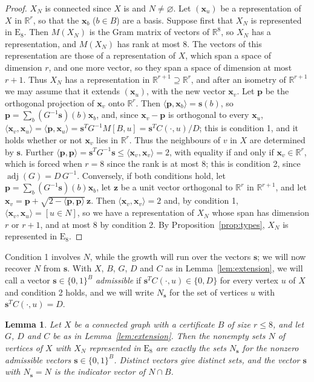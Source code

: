 \documentclass[11pt]{article}
\newcommand\re{{\mathbb R}}%
\newcommand\Zz{{\mathbf z}}
\newcommand\Zx{{\mathbf x}}
\newcommand\inv{^{-1}}
\newcommand\sps{\supseteq}
\newcommand\ip[2]{\langle#1,#2\rangle}
\newtheorem{lemma}[theorem]{Lemma}
\theoremstyle{definition}
\newcommand{\typ}[1]{\mathrm{#1}}
\newcommand\Zs{{\mathbf s}}
\newcommand\Zp{{\mathbf p}}
\begin{document}
\begin{proof}
$X_N$ is connected since $X$ is and $N\ne\varnothing$. Let $(\Zx_u)$ be a representation of $X$ in
$\re^r$, so that the $\Zx_b$ ($b\in B$) are a basis. Suppose first that $X_N$ is represented in
$\typ E_8$. Then $M(X_N)$ is the Gram matrix of vectors of $\re^8$, so $X_N$ has a
representation, and $M(X_N)$ has rank at most $8$. The vectors of this representation are those
of a representation of $X$, which span a space of dimension $r$, and one more vector, so they span
a space of dimension at most $r+1$. Thus $X_N$ has a representation in $\re^{r+1}\sps\re^r$, and
after an isometry of $\re^{r+1}$ we may assume that it extends $(\Zx_u)$, with the new vector
$\Zx_v$. Let $\Zp$ be the orthogonal projection of $\Zx_v$ onto $\re^r$. Then
$\ip{\Zp}{\Zx_b}=\Zs(b)$, so $\Zp=\sum_b(G\inv\Zs)(b)\Zx_b$, and, since $\Zx_v-\Zp$ is orthogonal
to every $\Zx_u$,
$\ip{\Zx_v}{\Zx_u}=\ip{\Zp}{\Zx_u}=\Zs^TG\inv M[B,u]=\Zs^TC(\cdot,u)/D$; this is condition 1,
and it holds whether or not $\Zx_v$ lies in $\re^r$. Thus the neighbours of $v$ in $X$ are
determined by $\Zs$. Further $\ip{\Zp}{\Zp}=\Zs^TG\inv\Zs\le\ip{\Zx_v}{\Zx_v}=2$, with equality
if and only if $\Zx_v\in\re^r$, which is forced when $r=8$ since the rank is at most $8$; this is
condition 2, since $\operatorname{adj}(G)=D\,G\inv$.
Conversely, if both conditions hold, let $\Zp=\sum_b(G\inv\Zs)(b)\Zx_b$, let $\Zz$ be a unit
vector orthogonal to $\re^r$ in $\re^{r+1}$, and let $\Zx_v=\Zp+\sqrt{2-\ip{\Zp}{\Zp}}\,\Zz$.
Then $\ip{\Zx_v}{\Zx_v}=2$ and, by condition 1, $\ip{\Zx_v}{\Zx_u}=[u\in N]$, so we have a
representation of $X_N$ whose span has dimension $r$ or $r+1$, and at most $8$ by condition 2. By
Proposition~\ref{prop:types}, $X_N$ is represented in $\typ E_8$.
\end{proof}

Condition 1 involves $N$, while the growth will run over the vectors $\Zs$; we will now recover
$N$ from $\Zs$. With $X$, $B$, $G$, $D$ and $C$ as in Lemma~\ref{lem:extension}, we will call a
vector $\Zs\in\{0,1\}^B$ \textsl{admissible} if $\Zs^TC(\cdot,u)\in\{0,D\}$ for every vertex $u$ of
$X$ and condition 2 holds, and we will write $N_\Zs$ for the set of vertices $u$ with
$\Zs^TC(\cdot,u)=D$.

\begin{lemma}\label{lem:admissible}
Let $X$ be a connected graph with a certificate $B$ of size $r\le8$, and let $G$, $D$ and $C$ be
as in Lemma~\ref{lem:extension}. Then the nonempty sets $N$ of vertices of $X$ with $X_N$
represented in $\typ E_8$ are exactly the sets $N_\Zs$ for the nonzero admissible vectors
$\Zs\in\{0,1\}^B$. Distinct vectors give distinct sets, and the vector $\Zs$ with $N_\Zs=N$ is the
indicator vector of $N\cap B$.
\end{lemma}
\end{document}
